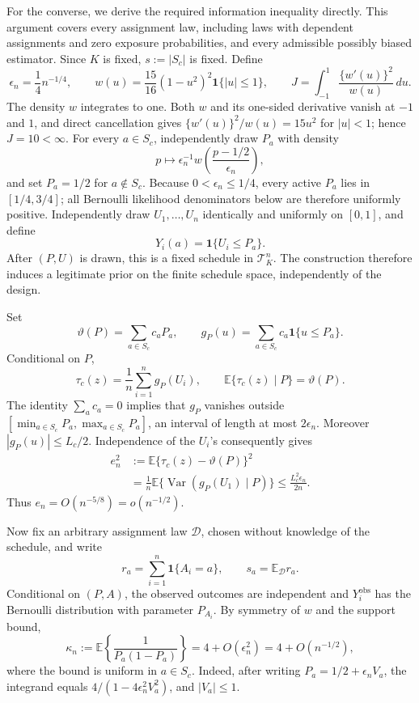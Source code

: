 For the converse, we derive the required information inequality directly.
This argument covers every assignment law, including laws with dependent
assignments and zero exposure probabilities, and every admissible possibly
biased estimator.  Since \(K\) is fixed, \(s:=|S_c|\) is fixed.  Define
\[
 \epsilon_n=\frac14n^{-1/4},
 \qquad
 w(u)=\frac{15}{16}(1-u^2)^2\mathbf 1\{|u|\le1\},
 \qquad
 J=\int_{-1}^1\frac{\{w'(u)\}^2}{w(u)}\,du.
\]
The density \(w\) integrates to one.  Both \(w\) and its one-sided
derivative vanish at \(-1\) and \(1\), and direct cancellation gives
\(\{w'(u)\}^2/w(u)=15u^2\) for \(|u|<1\); hence \(J=10<\infty\).
For every \(a\in S_c\), independently draw \(P_a\) with density
\[
 p\longmapsto \epsilon_n^{-1}
 w\!\left(\frac{p-1/2}{\epsilon_n}\right),
\]
and set \(P_a=1/2\) for \(a\notin S_c\).  Because
\(0<\epsilon_n\le1/4\), every active \(P_a\) lies in \([1/4,3/4]\);
all Bernoulli likelihood denominators below are therefore uniformly
positive.  Independently draw \(U_1,\ldots,U_n\) identically and uniformly
on \([0,1]\), and define
\[
 Y_i(a)=\mathbf 1\{U_i\le P_a\}.
\]
After \((P,U)\) is drawn, this is a fixed schedule in
\(\mathcal T_K^n\).  The construction therefore induces a legitimate
prior on the finite schedule space, independently of the design.

Set
\[
 \vartheta(P)=\sum_{a\in S_c}c_aP_a,
 \qquad
 g_P(u)=\sum_{a\in S_c}c_a\mathbf 1\{u\le P_a\}.
\]
Conditional on \(P\),
\[
 \tau_c(z)=\frac1n\sum_{i=1}^ng_P(U_i),
 \qquad
 \mathbb E\{\tau_c(z)\mid P\}=\vartheta(P).
\]
The identity \(\sum_a c_a=0\) implies that \(g_P\) vanishes outside
\([\min_{a\in S_c}P_a,\max_{a\in S_c}P_a]\), an interval of length at
most \(2\epsilon_n\).  Moreover \(|g_P(u)|\le L_c/2\).  Independence of
the \(U_i\)'s consequently gives
\[
 \begin{aligned}
 e_n^2
 &:=\mathbb E\{\tau_c(z)-\vartheta(P)\}^2\\
 &=\frac1n\mathbb E\{\operatorname{Var}(g_P(U_1)\mid P)\}
 \le\frac{L_c^2\epsilon_n}{2n}.
 \end{aligned}
\]
Thus \(e_n=O(n^{-5/8})=o(n^{-1/2})\).

Now fix an arbitrary assignment law \(\mathcal D\), chosen without
knowledge of the schedule, and write
\[
 r_a=\sum_{i=1}^n\mathbf 1\{A_i=a\},
 \qquad
 s_a=\mathbb E_{\mathcal D}r_a.
\]
Conditional on \((P,A)\), the observed outcomes are independent and
\(Y_i^{\mathrm{obs}}\) has the Bernoulli distribution with parameter
\(P_{A_i}\).  By symmetry of \(w\) and the support bound,
\[
 \kappa_n
 :=\mathbb E\!\left\{\frac1{P_a(1-P_a)}\right\}
 =4+O(\epsilon_n^2)=4+O(n^{-1/2}),
\]
where the bound is uniform in \(a\in S_c\).  Indeed, after writing
\(P_a=1/2+\epsilon_n V_a\), the integrand equals
\(4/(1-4\epsilon_n^2V_a^2)\), and \(|V_a|\le1\).

